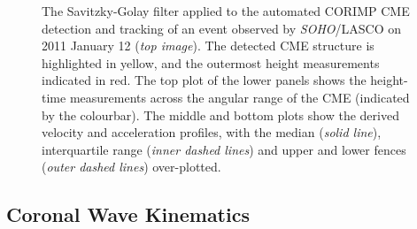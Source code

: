 \documentclass[structabstract]{aa}
\begin{document}
\begin{figure}[!t]
\caption{The Savitzky-Golay filter applied to the automated CORIMP CME detection and tracking of an event observed by \emph{SOHO}/LASCO on 2011 January 12 (\emph{top image}). The detected CME structure is highlighted in yellow, and the outermost height measurements indicated in red. The top plot of the lower panels shows the height-time measurements across the angular range of the CME (indicated by the colourbar). The middle and bottom plots show the derived velocity and acceleration profiles, with the median (\emph{solid line}), interquartile range (\emph{inner dashed lines}) and upper and lower fences (\emph{outer dashed lines}) over-plotted.}
\label{fig_savgol_CME_CORIMP}
\end{figure}


\subsection{Coronal Wave Kinematics}
\label{subsect:corpita}
\end{document}
